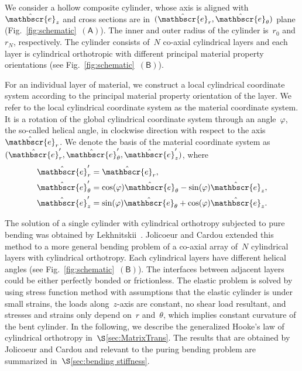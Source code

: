 \documentclass[preprint,10pt,times]{elsarticle}
\numberwithin{equation}{section}
\newcommand{\physe}{\hat{\mathbscr{e}}} %
\newcommand{\pr}[1]{\left( #1 \right)}
\newcommand{\subf}[1]{\pr{\textsf{#1}}}
\renewcommand{\>}{$\Rightarrow$}
\begin{document}
We consider a hollow composite cylinder, whose axis is aligned with~$\physe_{z}$ and cross sections are in~$(\physe_{r},\physe_{\theta})$ plane (Fig.~\ref{fig:schematic}~$\subf{A}$).
The inner and outer radius of the cylinder is~$r_0$ and~$r_N$, respectively.
The cylinder consists of~$N$ co-axial cylindrical layers and each layer is cylindrical orthotropic with different principal material property orientations (see Fig.~\ref{fig:schematic}~$\subf{B}$).

For an individual layer of material, we construct a local cylindrical coordinate system according to the principal material property orientation of the layer. We refer to the local cylindrical coordinate system as the material coordinate system. It is a rotation of the global cylindrical coordinate system through an angle~$\varphi$, the so-called helical angle, in clockwise direction with respect to the axis~$\physe_{r}$.
We denote the basis of the material coordinate system as~$(\physe'_{r},\physe'_{\theta},\physe'_{z})$, where
\begin{subequations}
\begin{align}
\physe'_{r} & =  \physe_r ,\\
\physe'_{\theta} & = \cos(\varphi) \physe_{\theta} - \sin(\varphi) \physe_z , \\
\physe'_{z} & = \sin(\varphi) \physe_{\theta} + \cos(\varphi) \physe_z .
\end{align}
\end{subequations}



The solution of a single cylinder with cylindrical orthotropy subjected to pure bending was obtained by Lekhnitskii~\cite{Lekhnitskii1981}. Jolicoeur and Cardou extended this method to a more general bending problem of a co-axial array of~$N$ cylindrical layers with cylindrical orthotropy. Each cylindrical layers have different helical angles (see Fig.~\ref{fig:schematic}~$\subf{B}$). The interfaces between adjacent layers could be either perfectly bonded or frictionless. The elastic problem is solved by using stress function method with assumptions that the elastic cylinder is under small strains, the loads along~$z$-axis are constant, no shear load resultant, and stresses and strains only depend on~$r$ and~$\theta$, which implies constant curvature of the bent cylinder. In the following, we describe the generalized Hooke's law of cylindrical orthotropy in~$\S$\ref{sec:MatrixTrans}. The results that are obtained by Jolicoeur and Cardou and relevant to the puring bending problem are summarized in~$\S$\ref{sec:bending stiffness}.
\end{document}
